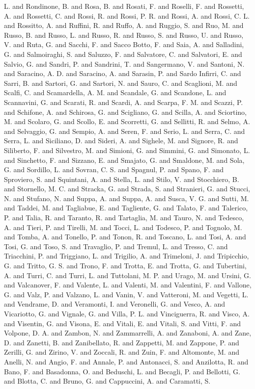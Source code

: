 {{{{L.  and Rondinone, B.  and Rosa, B.  and Rosati, F.  and Roselli, F.  and Rossetti, A.  and Rossetti, C.  and Rossi, R.  and Rossi, P. R.  and Rossi, A.  and Rossi, C. L.  and Rossitto, A.  and Ruffini, R.  and Ruffo, A.  and Ruggio, S.  and Ruo, M.  and Russo, B.  and Russo, L.  and Russo, R.  and Russo, S.  and Russo, U.  and Russo, V.  and Ruta, G.  and Sacchi, F.  and Sacco Botto, F.  and Saia, A.  and Salladini, G.  and Salmoiraghi, S.  and Saluzzo, F.  and Salvatore, C.  and Salvatori, E.  and Salvio, G.  and Sandri, P.  and Sandrini, T.  and Sangermano, V.  and Santoni, N.  and Saracino, A. D.  and Saracino, A.  and Sarasin, P.  and Sardo Infirri, C.  and Sarri, B.  and Sartori, G.  and Sartori, N.  and Sauro, C.  and Scaglioni, M.  and Scalfi, C.  and Scamardella, A. M.  and Scandale, G.  and Scandone, L.  and Scannavini, G.  and Scarati, R.  and Scardi, A.  and Scarpa, F. M.  and Scazzi, P.  and Schifone, A.  and Schirosa, G.  and Scigliano, G.  and Scilla, A.  and Sciortino, M.  and Scolaro, G.  and Scollo, E.  and Scorretti, G.  and Sellitti, R.  and Selmo, A.  and Selvaggio, G.  and Sempio, A.  and Seren, F.  and Serio, L.  and Serra, C.  and Serra, L.  and Siciliano, D.  and Sideri, A.  and Sighele, M.  and Signore, R.  and Siliberto, F.  and Silvestro, M.  and Simioni, G.  and Simmini, G.  and Simonato, L.  and Sinchetto, F.  and Sizzano, E.  and Smajato, G.  and Smaldone, M.  and Sola, G.  and Sordillo, L.  and Sovran, C. S.  and Spagnul, P.  and Spano, F.  and Sproviero, S.  and Squintani, A.  and Stella, L.  and Stilo, V.  and Stocchiero, B.  and Stornello, M. C.  and Stracka, G.  and Strada, S.  and Stranieri, G.  and Stucci, N.  and Stufano, N.  and Suppa, A.  and Suppa, A.  and Susca, V. G.  and Sutti, M.  and Taddei, M.  and Tagliabue, E.  and Tagliente, G.  and Talato, F.  and Talerico, P.  and Talia, R.  and Taranto, R.  and Tartaglia, M.  and Tauro, N.  and Tedesco, A.  and Tieri, P.  and Tirelli, M.  and Tocci, L.  and Todesco, P.  and Tognolo, M.  and Tomba, A.  and Tonello, P.  and Tonon, R.  and Toscano, L.  and Tosi, A.  and Tosi, G.  and Toso, S.  and Travaglio, P.  and Tremul, L.  and Tresso, C.  and Triacchini, P.  and Triggiano, L.  and Trigilio, A.  and Trimeloni, J.  and Tripicchio, G.  and Tritto, G. S.  and Trono, F.  and Trotta, E.  and Trotta, G.  and Tubertini, A.  and Turri, C.  and Turri, L.  and Tuttolani, M. P.  and Urago, M.  and Ursini, G.  and Valcanover, F.  and Valente, L.  and Valenti, M.  and Valentini, F.  and Vallone, G.  and Valz, P.  and Valzano, L.  and Vanin, V.  and Vatteroni, M.  and Vegetti, L.  and Vendrame, D.  and Veramonti, I.  and Veronelli, G.  and Vesco, A.  and Vicariotto, G.  and Vignale, G.  and Villa, P. L.  and Vinciguerra, R.  and Visco, A.  and Visentin, G.  and Visona, E.  and Vitali, E.  and Vitali, S.  and Vitti, F.  and Volpone, D. A.  and Zambon, N.  and Zammarrelli, A.  and Zanaboni, A.  and Zane, D.  and Zanetti, B.  and Zanibellato, R.  and Zappetti, M.  and Zappone, P.  and Zerilli, G.  and Zirino, V.  and Zoccali, R.  and Zuin, F.  and Altomonte, M.  and Anelli, N.  and Angio, F.  and Annale, P.  and Antonacci, S.  and Anzilotta, R.  and Bano, F.  and Basadonna, O.  and Beduschi, L.  and Becagli, P.  and Bellotti, G.  and Blotta, C.  and Bruno, G.  and Cappuccini, A.  and Caramatti, S.  }}}}
